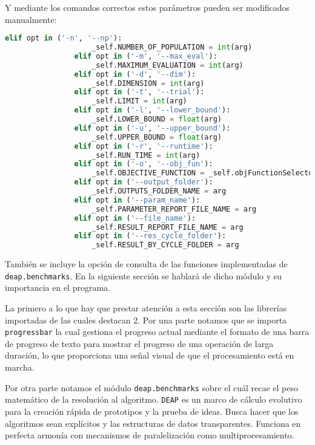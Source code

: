 \documentclass{article}
\begin{document}
Y mediante los comandos correctos estos parámetros pueden ser modificados manualmente:

\begin{lstlisting}[language=Python]
                elif opt in ('-n', '--np'):
                    _self.NUMBER_OF_POPULATION = int(arg)
                elif opt in ('-m', '--max_eval'):
                    _self.MAXIMUM_EVALUATION = int(arg)
                elif opt in ('-d', '--dim'):
                    _self.DIMENSION = int(arg)
                elif opt in ('-t', '--trial'):
                    _self.LIMIT = int(arg)
                elif opt in ('-l', '--lower_bound'):
                    _self.LOWER_BOUND = float(arg)
                elif opt in ('-u', '--upper_bound'):
                    _self.UPPER_BOUND = float(arg)
                elif opt in ('-r', '--runtime'):
                    _self.RUN_TIME = int(arg)
                elif opt in ('-o', '--obj_fun'):
                    _self.OBJECTIVE_FUNCTION = _self.objFunctionSelector.get(arg, "sphere")
                elif opt in ('--output_folder'):
                    _self.OUTPUTS_FOLDER_NAME = arg
                elif opt in ('--param_name'):
                    _self.PARAMETER_REPORT_FILE_NAME = arg
                elif opt in ('--file_name'):
                    _self.RESULT_REPORT_FILE_NAME = arg
                elif opt in ('--res_cycle_folder'):
                    _self.RESULT_BY_CYCLE_FOLDER = arg

\end{lstlisting}

También se incluye la opción de consulta de las funciones implementadas de \texttt{deap.benchmarks}. En la siguiente sección se hablará de dicho módulo y su importancia en el programa.



La primero a lo que hay que prestar atención a esta sección son las librerías importadas de las cuales destacan 2. Por una parte notamos que se importa \texttt{progressbar} la cual gestiona el progreso actual mediante el formato de una barra de progreso de texto para mostrar el progreso de una operación de larga duración, lo que proporciona una señal visual de que el procesamiento está en marcha.

Por otra parte notamos el módulo \texttt{deap.benchmarks} sobre el cuál recae el peso matemático de la resolución al algoritmo. \texttt{DEAP} es un marco de cálculo evolutivo para la creación rápida de prototipos y la prueba de ideas. Busca hacer que los algoritmos sean explícitos y las estructuras de datos transparentes. Funciona en perfecta armonía con mecanismos de paralelización como multiprocesamiento.\\
\end{document}
